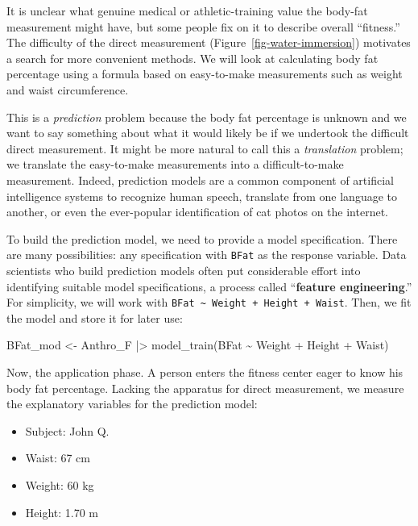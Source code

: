 \documentclass[
  letterpaper,
  DIV=11,
  numbers=noendperiod,
  oneside]{scrartcl}
\newenvironment{Shaded}{\begin{snugshade}}{\end{snugshade}}
\newcommand{\FunctionTok}[1]{\textcolor[rgb]{0.28,0.35,0.67}{#1}}
\newcommand{\NormalTok}[1]{\textcolor[rgb]{0.00,0.23,0.31}{#1}}
\newcommand{\OtherTok}[1]{\textcolor[rgb]{0.00,0.23,0.31}{#1}}
\newcommand{\SpecialCharTok}[1]{\textcolor[rgb]{0.37,0.37,0.37}{#1}}
\providecommand{\tightlist}{%
  \setlength{\itemsep}{0pt}\setlength{\parskip}{0pt}}\usepackage{longtable,booktabs,array}
\begin{document}
It is unclear what genuine medical or athletic-training value the
body-fat measurement might have, but some people fix on it to describe
overall ``fitness.'' The difficulty of the direct measurement
(Figure~\ref{fig-water-immersion}) motivates a search for more
convenient methods. We will look at calculating body fat percentage
using a formula based on easy-to-make measurements such as weight and
waist circumference.

This is a \emph{prediction} problem because the body fat percentage is
unknown and we want to say something about what it would likely be if we
undertook the difficult direct measurement. It might be more natural to
call this a \emph{translation} problem; we translate the easy-to-make
measurements into a difficult-to-make measurement. Indeed, prediction
models are a common component of artificial intelligence systems to
recognize human speech, translate from one language to another, or even
the ever-popular identification of cat photos on the internet.

To build the prediction model, we need to provide a model specification.
There are many possibilities: any specification with \texttt{BFat} as
the response variable. Data scientists who build prediction models often
put considerable effort into identifying suitable model specifications,
a process called ``\textbf{feature engineering}.'' For simplicity, we
will work with
\texttt{BFat\ \textasciitilde{}\ Weight\ +\ Height\ +\ Waist}. Then, we
fit the model and store it for later use:

\begin{Shaded}
\begin{Highlighting}[]
\NormalTok{BFat\_mod }\OtherTok{\textless{}{-}}\NormalTok{ Anthro\_F }\SpecialCharTok{|\textgreater{}} \FunctionTok{model\_train}\NormalTok{(BFat }\SpecialCharTok{\textasciitilde{}}\NormalTok{ Weight }\SpecialCharTok{+}\NormalTok{ Height }\SpecialCharTok{+}\NormalTok{ Waist)}
\end{Highlighting}
\end{Shaded}

Now, the application phase. A person enters the fitness center eager to
know his body fat percentage. Lacking the apparatus for direct
measurement, we measure the explanatory variables for the prediction
model:

\begin{itemize}
\tightlist
\item
  Subject: John Q.
\item
  Waist: 67 cm
\item
  Weight: 60 kg
\item
  Height: 1.70 m
\end{itemize}
\end{document}
